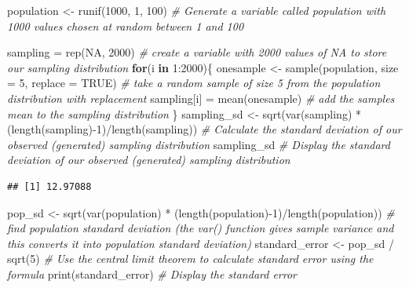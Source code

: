 \documentclass[
]{book}
\newenvironment{Shaded}{\begin{snugshade}}{\end{snugshade}}
\newcommand{\AttributeTok}[1]{\textcolor[rgb]{0.77,0.63,0.00}{#1}}
\newcommand{\CommentTok}[1]{\textcolor[rgb]{0.56,0.35,0.01}{\textit{#1}}}
\newcommand{\ConstantTok}[1]{\textcolor[rgb]{0.00,0.00,0.00}{#1}}
\newcommand{\ControlFlowTok}[1]{\textcolor[rgb]{0.13,0.29,0.53}{\textbf{#1}}}
\newcommand{\DecValTok}[1]{\textcolor[rgb]{0.00,0.00,0.81}{#1}}
\newcommand{\FunctionTok}[1]{\textcolor[rgb]{0.00,0.00,0.00}{#1}}
\newcommand{\NormalTok}[1]{#1}
\newcommand{\OtherTok}[1]{\textcolor[rgb]{0.56,0.35,0.01}{#1}}
\newcommand{\SpecialCharTok}[1]{\textcolor[rgb]{0.00,0.00,0.00}{#1}}
\begin{document}
\begin{Shaded}
\begin{Highlighting}[]
\NormalTok{population }\OtherTok{\textless{}{-}} \FunctionTok{runif}\NormalTok{(}\DecValTok{1000}\NormalTok{, }\DecValTok{1}\NormalTok{, }\DecValTok{100}\NormalTok{) }\CommentTok{\# Generate a variable called \textquotesingle{}population\textquotesingle{} with 1000 values chosen at random between 1 and 100}

\NormalTok{sampling }\OtherTok{=} \FunctionTok{rep}\NormalTok{(}\ConstantTok{NA}\NormalTok{, }\DecValTok{2000}\NormalTok{) }\CommentTok{\# create a variable with 2000 values of NA to store our sampling distribution}
\ControlFlowTok{for}\NormalTok{(i }\ControlFlowTok{in} \DecValTok{1}\SpecialCharTok{:}\DecValTok{2000}\NormalTok{)\{}
\NormalTok{  onesample }\OtherTok{\textless{}{-}} \FunctionTok{sample}\NormalTok{(population, }\AttributeTok{size =} \DecValTok{5}\NormalTok{, }\AttributeTok{replace =} \ConstantTok{TRUE}\NormalTok{) }\CommentTok{\# take a random sample of size 5 from the population distribution with replacement  }
\NormalTok{  sampling[i] }\OtherTok{=} \FunctionTok{mean}\NormalTok{(onesample) }\CommentTok{\# add the sample\textquotesingle{}s mean to the sampling distribution}
\NormalTok{\}}
\NormalTok{sampling\_sd }\OtherTok{\textless{}{-}} \FunctionTok{sqrt}\NormalTok{(}\FunctionTok{var}\NormalTok{(sampling) }\SpecialCharTok{*}\NormalTok{ (}\FunctionTok{length}\NormalTok{(sampling)}\SpecialCharTok{{-}}\DecValTok{1}\NormalTok{)}\SpecialCharTok{/}\FunctionTok{length}\NormalTok{(sampling)) }\CommentTok{\# Calculate the standard deviation of our observed (generated) sampling distribution}
\NormalTok{sampling\_sd }\CommentTok{\# Display the standard deviation of our observed (generated) sampling distribution}
\end{Highlighting}
\end{Shaded}

\begin{verbatim}
## [1] 12.97088
\end{verbatim}

\begin{Shaded}
\begin{Highlighting}[]
\NormalTok{pop\_sd }\OtherTok{\textless{}{-}} \FunctionTok{sqrt}\NormalTok{(}\FunctionTok{var}\NormalTok{(population) }\SpecialCharTok{*}\NormalTok{ (}\FunctionTok{length}\NormalTok{(population)}\SpecialCharTok{{-}}\DecValTok{1}\NormalTok{)}\SpecialCharTok{/}\FunctionTok{length}\NormalTok{(population)) }\CommentTok{\# find population standard deviation (the var() function gives sample variance and this converts it into population standard deviation)}
\NormalTok{standard\_error }\OtherTok{\textless{}{-}}\NormalTok{ pop\_sd }\SpecialCharTok{/} \FunctionTok{sqrt}\NormalTok{(}\DecValTok{5}\NormalTok{) }\CommentTok{\# Use the central limit theorem to calculate standard error using the formula}
\FunctionTok{print}\NormalTok{(standard\_error) }\CommentTok{\# Display the standard error}
\end{Highlighting}
\end{Shaded}
\end{document}
